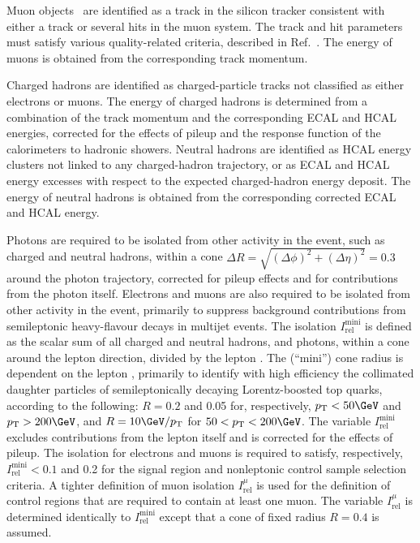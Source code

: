 Muon objects~\cite{Chatrchyan:2012xi} are identified as a track in the
silicon tracker consistent with either a track or several hits in the
muon system. The track and hit parameters must satisfy various
quality-related criteria, described in Ref.~\cite{Chatrchyan:2012xi}.
The energy of muons is obtained from the corresponding track momentum.

Charged hadrons are identified as charged-particle tracks not
classified as either electrons or muons.
The energy of charged hadrons is determined from a combination of the
track momentum and the corresponding ECAL and HCAL energies, corrected
for the effects of pileup and the response function of the
calorimeters to hadronic showers. Neutral hadrons are identified as
HCAL energy clusters not linked to any charged-hadron trajectory, or
as ECAL and HCAL energy excesses with respect to the expected
charged-hadron energy deposit.  The energy of neutral hadrons is
obtained from the corresponding corrected ECAL and HCAL energy.

Photons are required to be isolated from other activity in the event,
such as charged and neutral hadrons, within a cone $\Delta R =
\sqrt{(\Delta\phi)^2 + (\Delta\eta)^2} = 0.3$ around the photon
trajectory, corrected for pileup effects and for contributions from
the photon itself. Electrons and muons are also required to be
isolated from other activity in the event, primarily to suppress
background contributions from semileptonic heavy-flavour decays in
multijet events. The isolation $I^\text{mini}_\text{rel}$ is defined
as the scalar \Pt sum of all charged and neutral hadrons, and photons, 
within a cone around the lepton direction, divided by the lepton
\Pt. The (``mini'') cone radius is dependent on the lepton \Pt,
primarily to identify with high efficiency the collimated daughter
particles of semileptonically decaying Lorentz-boosted top quarks,
according to the following: $R = 0.2$ and 0.05 for, respectively, $\Pt
< 50\GeV$ and $\Pt > 200\GeV$, and $R = 10\GeV / \Pt$ for $50 < \Pt <
200\GeV$. The variable $I^\text{mini}_\text{rel}$ excludes
contributions from the lepton itself and is corrected for the effects
of pileup. The isolation for electrons and muons is required to
satisfy, respectively, $I^\text{mini}_\text{rel} < 0.1$ and 0.2 for
the signal region and nonleptonic control sample selection criteria.
A tighter definition of muon isolation $I^{\mu}_\text{rel}$ is used
for the definition of control regions that are required to contain at
least one muon. The variable $I^{\mu}_\text{rel}$ is determined
identically to $I^\text{mini}_\text{rel}$ except that a cone of fixed
radius $R = 0.4$ is assumed.

